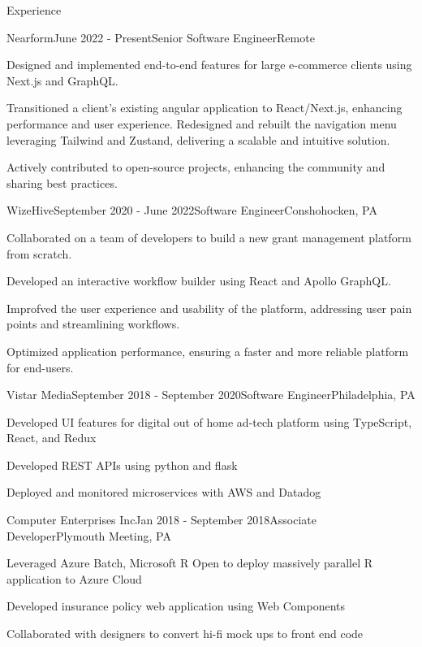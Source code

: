 \documentclass{resume} %
\begin{document}
\begin{rSection}{Experience}

\begin{rSubsection}{Nearform}{June 2022 - Present}{Senior Software Engineer}{Remote}
\item Designed and implemented end-to-end features for large e-commerce clients using Next.js and GraphQL.
\item Transitioned a client’s existing angular application to React/Next.js, enhancing performance and user experience. Redesigned and rebuilt the navigation menu leveraging Tailwind and Zustand, delivering a scalable and intuitive solution.
\item Actively contributed to open-source projects, enhancing the community and sharing best practices.
\end{rSubsection}

\begin{rSubsection}{WizeHive}{September 2020 - June 2022}{Software Engineer}{Conshohocken, PA}
\item Collaborated on a team of developers to build a new grant management platform from scratch.
\item Developed an interactive workflow builder using React and Apollo GraphQL.
\item Improfved the user experience and usability of the platform, addressing user pain points and streamlining workflows.
\item Optimized application performance, ensuring a faster and more reliable platform for end-users.
\end{rSubsection}

\begin{rSubsection}{Vistar Media}{September 2018 - September 2020}{Software Engineer}{Philadelphia, PA}
\item Developed UI features for digital out of home ad-tech platform using TypeScript, React, and Redux
\item Developed REST APIs using python and flask
\item Deployed and monitored microservices with AWS and Datadog
\end{rSubsection}

\begin{rSubsection}{Computer Enterprises Inc}{Jan 2018 - September 2018}{Associate Developer}{Plymouth Meeting, PA}
\item Leveraged Azure Batch, Microsoft R Open to deploy massively parallel R application to Azure Cloud
\item Developed insurance policy web application using Web Components
\item Collaborated with designers to convert hi-fi mock ups to front end code
\end{rSubsection}


\end{rSection}
\end{document}
